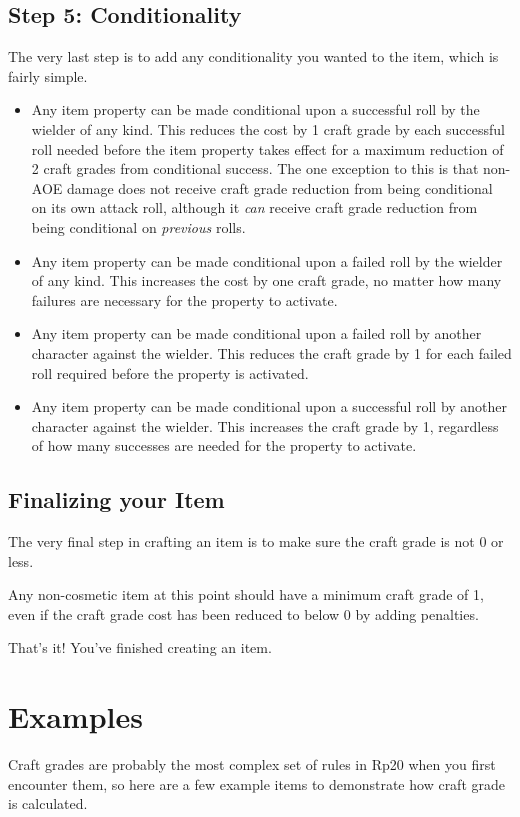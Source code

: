 \subsection{Step 5: Conditionality}
The very last step is to add any conditionality you wanted to the item, which is fairly simple.

\begin{itemize}
\item Any item property can be made conditional upon a successful roll by the wielder of any kind. This reduces the cost by 1 craft grade by each successful roll needed before the item property takes effect for a maximum reduction of 2 craft grades from conditional success. The one exception to this is that non-AOE damage does not receive craft grade reduction from being conditional on its own attack roll, although it \emph{can} receive craft grade reduction from being conditional on \emph{previous} rolls.

\item Any item property can be made conditional upon a failed roll by the wielder of any kind. This increases the cost by one craft grade, no matter how many failures are necessary for the property to activate.

\item Any item property can be made conditional upon a failed roll by another character against the wielder. This reduces the craft grade by 1 for each failed roll required before the property is activated.

\item Any item property can be made conditional upon a successful roll by another character against the wielder. This increases the craft grade by 1, regardless of how many successes are needed for the property to activate.
\end{itemize}

\subsection{Finalizing your Item}
The very final step in crafting an item is to make sure the craft grade is not 0 or less.

Any non-cosmetic item at this point should have a minimum craft grade of 1, even if the craft grade cost has been reduced to below 0 by adding penalties.

That's it! You've finished creating an item.

\section{Examples}
Craft grades are probably the most complex set of rules in Rp20 when you first encounter them, so here are a few example items to demonstrate how craft grade is calculated.

